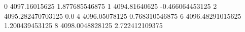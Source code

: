 0 4097.16015625 1.877685546875
1 4094.81640625 -0.466064453125
2 4095.282470703125 0.0
4 4096.05078125 0.768310546875
6 4096.48291015625 1.200439453125
8 4098.0048828125 2.722412109375
